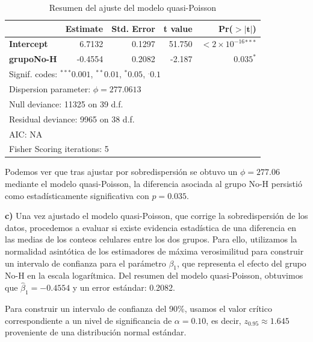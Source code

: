 \begin{table}[H]
\centering
\caption{Resumen del ajuste del modelo quasi-Poisson}
\begin{tabular}{lrrrr}
\hline
 & \textbf{Estimate} & \textbf{Std. Error} & \textbf{t value} & \textbf{Pr($\mathbf{>|t|}$)} \\
\hline
\textbf{Intercept}  & 6.7132 & 0.1297 & 51.750 & $<2\times 10^{-16}$$^{***}$ \\
\textbf{grupoNo-H}  & -0.4554 & 0.2082 & -2.187 & $0.035^{*}$ \\
\hline
\multicolumn{5}{l}{\footnotesize Signif. codes: $^{***}0.001$, $^{**}0.01$, $^{*}0.05$, $^{.}0.1$} \\
\multicolumn{5}{l}{\footnotesize Dispersion parameter: $\phi = 277.0613$} \\
\multicolumn{5}{l}{\footnotesize Null deviance: 11325 on 39 d.f.} \\
\multicolumn{5}{l}{\footnotesize Residual deviance: 9965 on 38 d.f.} \\
\multicolumn{5}{l}{\footnotesize AIC: NA} \\
\multicolumn{5}{l}{\footnotesize Fisher Scoring iterations: 5} \\
\end{tabular}
\end{table}

\begin{tcolorbox}
Podemos ver que tras ajustar por sobredispersión se obtuvo un $\phi = 277.06$ mediante el modelo quasi-Poisson, la diferencia asociada al grupo No-H persistió como estadísticamente significativa con $p = 0.035$.
\end{tcolorbox}

\textbf{c)} Una vez ajustado el modelo quasi-Poisson, que corrige la sobredispersión de los datos, procedemos a evaluar si existe evidencia estadística de una diferencia en las medias de los conteos celulares entre los dos grupos. Para ello, utilizamos la normalidad asintótica de los estimadores de máxima verosimilitud para construir un intervalo de confianza para el parámetro $\beta_1$, que representa el efecto del grupo No-H en la escala logarítmica. Del resumen del modelo quasi-Poisson, obtuvimos que $\widehat{\beta}_1= -0.4554$ y un error estándar: 0.2082.

Para construir un intervalo de confianza del 90\%, usamos el valor crítico correspondiente a un nivel de significancia de $\alpha=0.10$, es decir, $z_{0.95}\approx1.645$ proveniente de una distribución normal estándar. 

